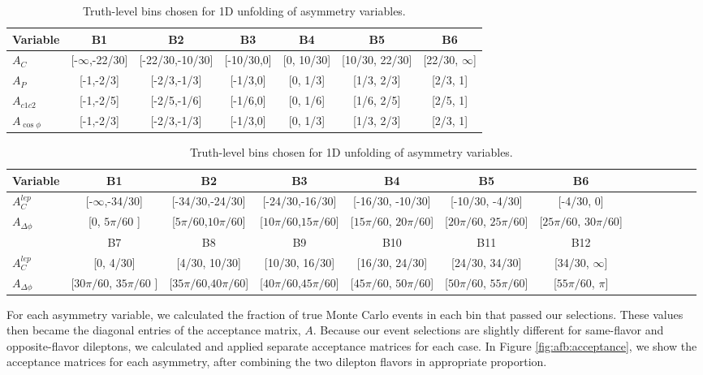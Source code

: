 \begin{table}
\begin{center}
\caption{Truth-level bins chosen for 1D unfolding of asymmetry variables.}
\label{tab:afb:binning1d}
\begin{tabular}{l |  c  c  c  c  c  c }
\hline
Variable &  B1  &  B2 &  B3 &  B4 &  B5 &  B6\\ \hline
$A_{C}$  &        [-$\infty$,-22/30]  &  [-22/30,-10/30]  &  [-10/30,0]  &  [0, 10/30]  &  [10/30, 22/30]  &  [22/30, $\infty$] \\ \hline
$A_{P}$             &  [-1,-2/3]  &  [-2/3,-1/3]  &  [-1/3,0]  &  [0, 1/3]  &  [1/3, 2/3]  &  [2/3, 1] \\ \hline
$A_{c1c2}$        &  [-1,-2/5]  &  [-2/5,-1/6]  &  [-1/6,0]  &  [0, 1/6]  &  [1/6, 2/5]  &  [2/5, 1] \\ \hline
$A_{\cos\phi}$       &  [-1,-2/3]  &  [-2/3,-1/3]  &  [-1/3,0]  &  [0, 1/3]  &  [1/3, 2/3]  &  [2/3, 1] \\ \hline
\end{tabular}

\bigskip

\begin{tabular}{l |  c  c  c  c  c  c c c c c c c }
\hline
Variable &  B1  &  B2 &  B3 &  B4 &  B5 &  B6 \\ \hline
$A_C^{lep}$  &  [-$\infty$,-34/30]  &  [-34/30,-24/30]  &  [-24/30,-16/30]  &  [-16/30, -10/30]  &  [-10/30, -4/30]  &  [-4/30, 0] \\
\hline
$A_{\Delta\phi}$ &  [0, $5\pi/60$ ]  &  [$5\pi/60$,$10\pi/60$]  &  [$10\pi/60$,$15\pi/60$]  &  [$15\pi/60$, $20\pi/60$]  &  [$20\pi/60$, $25\pi/60$]  &  [$25\pi/60$, $30\pi/60$] \\
\hline \hline
  &  B7 &  B8 &  B9 &  B10 &  B11 &  B12 \\ \hline
$A_C^{lep}$ & [0, 4/30] & [4/30, 10/30] & [10/30, 16/30] & [16/30, 24/30] & [24/30, 34/30] & [34/30, $\infty$] \\ \hline
$A_{\Delta\phi}$ & [$30\pi/60$, $35\pi/60$ ]  &  [$35\pi/60$,$40\pi/60$]  &  [$40\pi/60$,$45\pi/60$]  &  [$45\pi/60$, $50\pi/60$]  &  [$50\pi/60$, $55\pi/60$]  &  [$55\pi/60$, $\pi$] \\ \hline
\end{tabular}
\end{center}
\end{table}

For each asymmetry variable, we calculated the fraction of true
Monte Carlo events in each bin that passed our selections. These
values then became the diagonal entries of the acceptance matrix,
$A$. Because our event selections are slightly different for
same-flavor and opposite-flavor dileptons, we calculated and applied
separate acceptance matrices for each case. In Figure \ref{fig:afb:acceptance}, we
show the acceptance matrices for each asymmetry, after combining
the two dilepton flavors in appropriate proportion.

